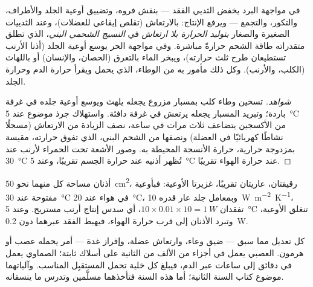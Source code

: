 \begin{proposition}\label{prop:b1:mammal-organization:thermoreg}
في مواجهة البرد يخفض الثديي الفقد --- بنفش فروه، وتضييق أوعية الجلد
والأطراف، والتكور، والتجمع --- ويرفع الإنتاج: بالارتعاش (تقلص
إيقاعي للعضلات)، وعند الثدييات الصغيرة والصغار
\emph{بتوليد الحرارة بلا ارتعاش} في
\emph{النسيج الشحمي البني}، الذي تطلق
متقدراته طاقة الشحم حرارةً مباشرة. وفي مواجهة الحر يوسع أوعية الجلد
(أذنا الأرنب تستطيعان طرح ثلث حرارته)، ويبخر الماء بالتعرق (الحصان،
والإنسان) أو باللهاث (الكلب، والأرنب). وكل ذلك مأمور به من الوطاء،
الذي يحمل  ويقرأ حرارة الدم وحرارة الجلد.
\end{proposition}
\begin{proof}[شواهد]
تسخين وطاء كلب بمسبار مزروع يجعله يلهث ويوسع أوعية جلده في غرفة
باردة؛ وتبريد المسبار يجعله يرتعش في غرفة دافئة. واستهلاك جرذ موضوع
عند \qty{5}{\celsius} من الأكسجين يتضاعف ثلاث مرات في ساعة، نصف
الزيادة من الارتعاش (مسجلًا نشاطًا كهربائيًا في العضلة) ونصفها من
الشحم البني، الذي تفوق حرارته، مقيسة بمزدوجة حرارية، حرارة الأنسجة
المحيطة به. وصور الأشعة تحت الحمراء لأرنب عند \qty{30}{\celsius}
تُظهر أذنيه عند حرارة الجسم تقريبًا، وعند \qty{5}{\celsius} عند
حرارة الهواء تقريبًا.
\end{proof}

\begin{example}\label{ex:b1:mammal-organization:ears}
أذنان مساحة كل منهما نحو \qty{50}{cm^2}، رقيقتان، عاريتان تقريبًا،
غزيرتا الأوعية: فبأوعية مفتوحة عند \qty{30}{\celsius} في هواء عند
\qty{20}{\celsius}، وبمعامل جلد عار قدره
\qty{10}{W.m^{-2}.K^{-1}}، تفقدان
$10\times 0.01\times 10 =
\qty{1}{W}$، أي سدس إنتاج أرنب مستريح.
وعند \qty{5}{\celsius} تنغلق الأوعية، وتبرد الأذنان إلى قرب حرارة
الهواء، فيهبط الفقد عبرهما دون \qty{0.2}{W}.
\end{example}

\begin{remark}[التنسيق]\label{rem:b1:mammal-organization:coordination}
كل تعديل مما سبق --- ضيق وعاء، وارتعاش عضلة، وإفراز غدة --- أمر
يحمله عصب أو هرمون.  العصبي يعمل في أجزاء من الألف من الثانية
على أسلاك ثابتة؛  الصماوي يعمل في دقائق إلى ساعات عبر الدم،
فيبلغ كل خلية تحمل المستقبِل المناسب. وآلياتهما موضوع كتاب السنة
الثانية؛ أما هذه السنة فتأخذهما مسلَّمين وتدرس ما ينسقانه.
\end{remark}

